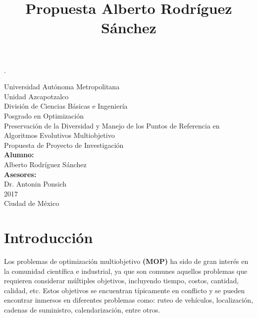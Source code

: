 \documentclass[letterpaper,10pt]{article}
\title{Propuesta Alberto Rodríguez Sánchez}
\begin{document}
\renewcommand{\refname}{Bibliografía}.
\thispagestyle{empty}

\begin{center}
    {\Huge Universidad Autónoma Metropolitana }\\
    {\huge Unidad Azcapotzalco}\\
    \vspace{0.5cm}
    {\Large División de Ciencias Básicas e Ingeniería}\\
    \vspace{1.0cm}
    {\large Posgrado en Optimización}\\
    \vspace{2.0cm}    
    {\Large Preservación de la Diversidad y Manejo de los Puntos de Referencia en Algoritmos Evolutivos Multiobjetivo}\\
    \vspace{1.0cm}
    {\large Propuesta de Proyecto de Investigación}\\
    \vspace{2.0cm}
    {\large\textbf{Alumno:}}\\
    Alberto Rodríguez Sánchez\\
    \vspace{1.5cm}
    \bigskip
    {\large\textbf{Asesores:}}\\
    Dr. Antonin Ponsich\\
    
    \vspace{1.5cm}
     2017\\
    \vspace{1.0cm}
    Ciudad de México\\
\end{center}
\newpage
\tableofcontents
\newpage
\section{Introducción}

Los problemas de optimización multiobjetivo \textbf{(MOP)} ha sido de gran interés en la comunidad científica e industrial, ya que son comunes aquellos problemas que requieren
considerar múltiples objetivos, incluyendo tiempo, costos, cantidad, calidad, etc. Estos objetivos se encuentran típicamente en conflicto y se pueden encontrar inmersos en
diferentes problemas como: ruteo de vehículos, localización, cadenas de suministro, calendarización, entre otros.\\
\end{document}
